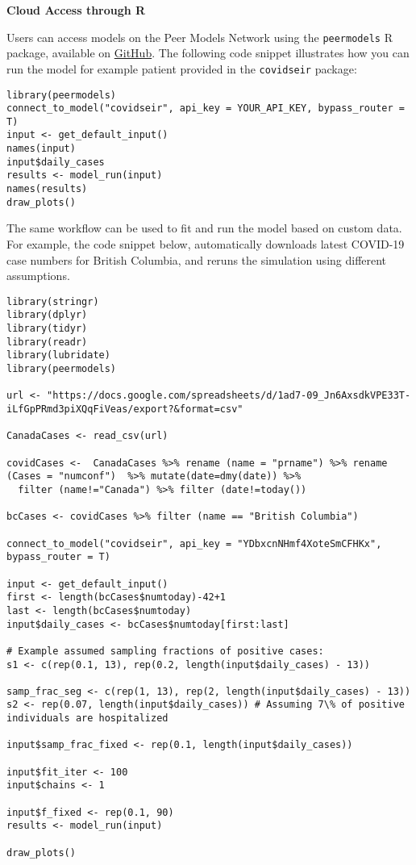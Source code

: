 \documentclass[
]{book}
\begin{document}
\textbf{Cloud Access through R}

Users can access models on the Peer Models Network using the \texttt{peermodels} R package, available on \href{https://github.com/resplab/peermodels}{GitHub}. The following code snippet illustrates how you can run the model for example patient provided in the \texttt{covidseir} package:

\begin{verbatim}
library(peermodels)
connect_to_model("covidseir", api_key = YOUR_API_KEY, bypass_router = T)
input <- get_default_input()
names(input)
input$daily_cases
results <- model_run(input)
names(results)
draw_plots()
\end{verbatim}

The same workflow can be used to fit and run the model based on custom data. For example, the code snippet below, automatically downloads latest COVID-19 case numbers for British Columbia, and reruns the simulation using different assumptions.

\begin{verbatim}
library(stringr)
library(dplyr)
library(tidyr)
library(readr)
library(lubridate)
library(peermodels)

url <- "https://docs.google.com/spreadsheets/d/1ad7-09_Jn6AxsdkVPE33T-iLfGpPRmd3piXQqFiVeas/export?&format=csv"

CanadaCases <- read_csv(url)

covidCases <-  CanadaCases %>% rename (name = "prname") %>% rename (Cases = "numconf")  %>% mutate(date=dmy(date)) %>%
  filter (name!="Canada") %>% filter (date!=today())

bcCases <- covidCases %>% filter (name == "British Columbia")

connect_to_model("covidseir", api_key = "YDbxcnNHmf4XoteSmCFHKx", bypass_router = T)

input <- get_default_input()
first <- length(bcCases$numtoday)-42+1
last <- length(bcCases$numtoday)
input$daily_cases <- bcCases$numtoday[first:last]

# Example assumed sampling fractions of positive cases:
s1 <- c(rep(0.1, 13), rep(0.2, length(input$daily_cases) - 13))

samp_frac_seg <- c(rep(1, 13), rep(2, length(input$daily_cases) - 13))
s2 <- rep(0.07, length(input$daily_cases)) # Assuming 7\% of positive individuals are hospitalized

input$samp_frac_fixed <- rep(0.1, length(input$daily_cases))

input$fit_iter <- 100
input$chains <- 1

input$f_fixed <- rep(0.1, 90)
results <- model_run(input)

draw_plots()
\end{verbatim}
\end{document}
